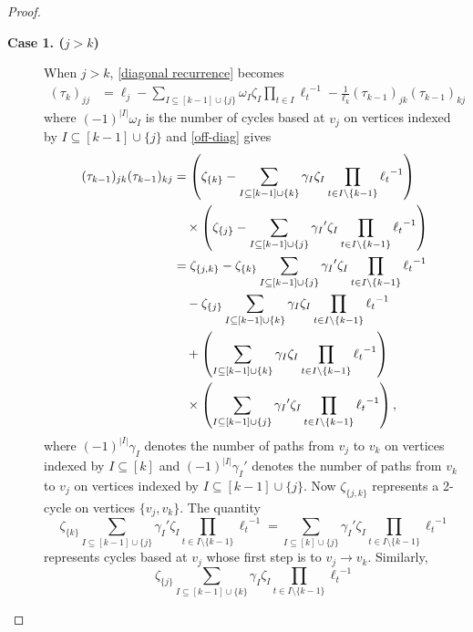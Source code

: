 \documentclass{article}
\theoremstyle{definition}
\numberwithin{equation}{section}
\begin{document}
\begin{proof}
\begin{description}
\item [{\bf Case 1. ($j>k$)}]
When $j>k$, \eqref{diagonal recurrence} becomes
\begin{align*}
(\tau_k)_{jj}&=\ell_j-\sum_{I\subseteq [k-1]\cup\{j\}}\omega_I\zeta_I\prod_{t\in I}{\ell_t}^{-1}-\frac{1}{\ell_k}(\tau_{k-1})_{jk}(\tau_{k-1})_{kj}
\end{align*}
where $(-1)^{|I|}\omega_I$ is the number of cycles based at $v_j$ on vertices indexed by $I\subseteq[k-1]\cup\{j\}$ and \eqref{off-diag} gives
\begin{align*}
(\tau_{k-1})_{jk}(\tau_{k-1})_{kj}&=\left(\zeta_{\{k\}}-\sum_{I\subseteq [k-1]\cup\{k\}}\gamma_I\zeta_I\prod_{t\in I\setminus\{k-1\}}{\ell_t}^{-1}\right)\\
&\hskip10pt\times\left(\zeta_{\{j\}}-\sum_{I\subseteq [k-1]\cup\{j\}}{\gamma_I}'\zeta_I\prod_{t\in I\setminus\{k-1\}}{\ell_t}^{-1}\right)\\
&=\zeta_{\{j,k\}}-\zeta_{\{k\}}\sum_{I\subseteq [k-1]\cup\{j\}}{\gamma_I}'\zeta_I\prod_{t\in I\setminus\{k-1\}}{\ell_t}^{-1}\\
&\hskip10pt -\zeta_{\{j\}}\sum_{I\subseteq [k-1]\cup\{k\}}\gamma_I\zeta_I\prod_{t\in I\setminus\{k-1\}}{\ell_t}^{-1}\\
&\hskip10pt+\left(\sum_{I\subseteq [k-1]\cup\{k\}}\gamma_I\zeta_I\prod_{t\in I\setminus\{k-1\}}{\ell_t}^{-1}\right)\\
&\hskip10pt\times\left(\sum_{I\subseteq [k-1]\cup\{j\}}{\gamma_I}'\zeta_I\prod_{t\in I\setminus\{k-1\}}{\ell_t}^{-1}\right),
\end{align*}
where $(-1)^{|I|}\gamma_I$ denotes the number of paths from $v_j$ to $v_k$ on vertices indexed by $I\subseteq [k]$ and $(-1)^{|I|}{\gamma_I}'$ denotes the number of paths from $v_k$ to $v_j$ on vertices indexed by $I\subseteq [k-1]\cup \{j\}$.  Now $\zeta_{\{j,k\}}$ represents a 2-cycle on vertices $\{v_j, v_k\}$.  The quantity \begin{equation*}
\zeta_{\{k\}}\sum_{I\subseteq [k-1]\cup\{j\}}{\gamma_I}'\zeta_I\prod_{t\in I\setminus\{k-1\}}{\ell_t}^{-1}=\sum_{I\subseteq [k]\cup\{j\}}{\gamma_I}'\zeta_I\prod_{t\in I\setminus\{k-1\}}{\ell_t}^{-1}
\end{equation*}
represents cycles based at $v_j$ whose first step is to $v_j\to v_k$.  Similarly, 
\begin{equation*}
\zeta_{\{j\}}\sum_{I\subseteq [k-1]\cup\{k\}}\gamma_I\zeta_I\prod_{t\in I\setminus\{k-1\}}{\ell_t}^{-1}
\end{equation*}

\end{description}
\end{proof}
\end{document}
